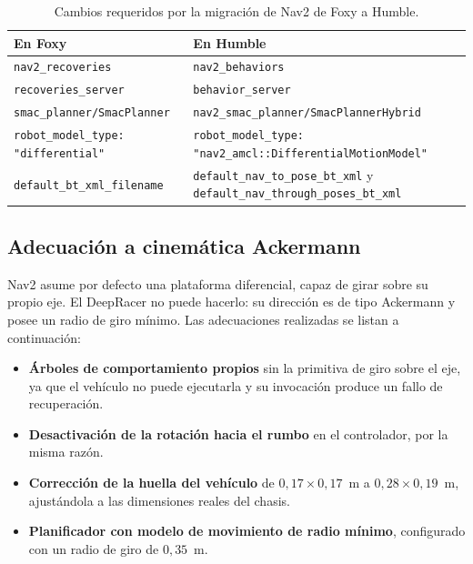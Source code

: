 \documentclass[12pt,letterpaper]{article}
\begin{document}
\begin{table}[H]
    \centering
    \small
    \caption{Cambios requeridos por la migración de Nav2 de Foxy a Humble.}
    \label{tab:migracion}
    \begin{tabular}{@{}p{6.3cm}p{7.2cm}@{}}
        \toprule
        \textbf{En Foxy} & \textbf{En Humble} \\ \midrule
        \texttt{nav2\_recoveries} & \texttt{nav2\_behaviors} \\
        \texttt{recoveries\_server} & \texttt{behavior\_server} \\
        \texttt{smac\_planner/SmacPlanner} & \texttt{nav2\_smac\_planner/SmacPlannerHybrid} \\
        \texttt{robot\_model\_type: "differential"} & \texttt{robot\_model\_type:} \texttt{"nav2\_amcl::DifferentialMotionModel"} \\
        \texttt{default\_bt\_xml\_filename} & \texttt{default\_nav\_to\_pose\_bt\_xml} y \texttt{default\_nav\_through\_poses\_bt\_xml} \\ \bottomrule
    \end{tabular}
\end{table}

\subsection{Adecuación a cinemática Ackermann}

Nav2 asume por defecto una plataforma diferencial, capaz de girar sobre su propio eje. El DeepRacer no puede hacerlo: su dirección es de tipo Ackermann y posee un radio de giro mínimo. Las adecuaciones realizadas se listan a continuación:

\begin{itemize}
    \item \textbf{Árboles de comportamiento propios} sin la primitiva de giro sobre el eje, ya que el vehículo no puede ejecutarla y su invocación produce un fallo de recuperación.
    \item \textbf{Desactivación de la rotación hacia el rumbo} en el controlador, por la misma razón.
    \item \textbf{Corrección de la huella del vehículo} de $0{,}17 \times 0{,}17$~m a $0{,}28 \times 0{,}19$~m, ajustándola a las dimensiones reales del chasis.
    \item \textbf{Planificador con modelo de movimiento de radio mínimo}, configurado con un radio de giro de $0{,}35$~m.
\end{itemize}
\end{document}
